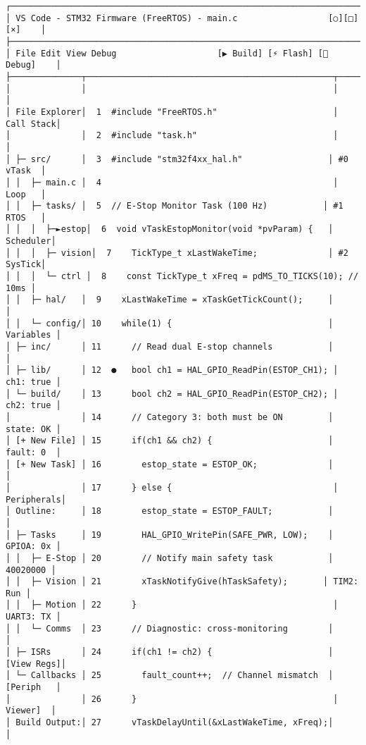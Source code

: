 \documentclass[
]{article}
\begin{document}
\begin{verbatim}
┌────────────────────────────────────────────────────────────────────────────┐
│ VS Code - STM32 Firmware (FreeRTOS) - main.c                  [○][□][×]    │
├────────────────────────────────────────────────────────────────────────────┤
│ File Edit View Debug                    [▶ Build] [⚡ Flash] [🐞 Debug]    │
├──────────────┬─────────────────────────────────────────────────┬───────────┤
│              │                                                 │           │
│ File Explorer│  1  #include "FreeRTOS.h"                       │ Call Stack│
│              │  2  #include "task.h"                           │           │
│ ├─ src/      │  3  #include "stm32f4xx_hal.h"                 │ #0 vTask  │
│ │  ├─ main.c │  4                                              │    Loop   │
│ │  ├─ tasks/ │  5  // E-Stop Monitor Task (100 Hz)           │ #1 RTOS   │
│ │  │  ├─►estop│  6  void vTaskEstopMonitor(void *pvParam) {   │    Scheduler│
│ │  │  ├─ vision│  7    TickType_t xLastWakeTime;              │ #2 SysTick│
│ │  │  └─ ctrl │  8    const TickType_t xFreq = pdMS_TO_TICKS(10); // 10ms │
│ │  ├─ hal/   │  9    xLastWakeTime = xTaskGetTickCount();     │           │
│ │  └─ config/│ 10    while(1) {                               │ Variables │
│ ├─ inc/      │ 11      // Read dual E-stop channels           │           │
│ ├─ lib/      │ 12  ●   bool ch1 = HAL_GPIO_ReadPin(ESTOP_CH1); │ ch1: true │
│ └─ build/    │ 13      bool ch2 = HAL_GPIO_ReadPin(ESTOP_CH2); │ ch2: true │
│              │ 14      // Category 3: both must be ON         │ state: OK │
│ [+ New File] │ 15      if(ch1 && ch2) {                       │ fault: 0  │
│ [+ New Task] │ 16        estop_state = ESTOP_OK;              │           │
│              │ 17      } else {                                │ Peripherals│
│ Outline:     │ 18        estop_state = ESTOP_FAULT;           │           │
│ ├─ Tasks     │ 19        HAL_GPIO_WritePin(SAFE_PWR, LOW);    │ GPIOA: 0x │
│ │  ├─ E-Stop │ 20        // Notify main safety task           │  40020000 │
│ │  ├─ Vision │ 21        xTaskNotifyGive(hTaskSafety);       │ TIM2: Run │
│ │  ├─ Motion │ 22      }                                       │ UART3: TX │
│ │  └─ Comms  │ 23      // Diagnostic: cross-monitoring        │           │
│ ├─ ISRs      │ 24      if(ch1 != ch2) {                       │ [View Regs]│
│ └─ Callbacks │ 25        fault_count++;  // Channel mismatch  │ [Periph   │
│              │ 26      }                                       │  Viewer]  │
│ Build Output:│ 27      vTaskDelayUntil(&xLastWakeTime, xFreq);│           │

\end{verbatim}
\end{document}
